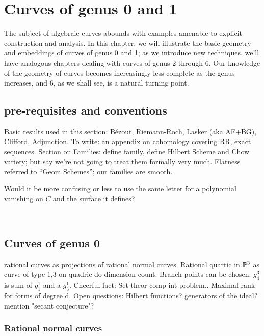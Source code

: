 

\chapter{Curves of genus 0 and 1}\label{genus 0 and 1 chapter}

The subject of algebraic curves abounds with examples amenable to explicit construction and analysis. In this chapter, we will illustrate  the basic geometry and embeddings of curves of genus 0 and 1; as we introduce new techniques, we'll have analogous chapters dealing with curves of genus 2 through 6. Our knowledge of the geometry of curves becomes increasingly less complete as the genus increases, and 6, as we shall see, is a natural turning point. 
\section{pre-requisites and conventions}


Basic results used in this section: B\'ezout, Riemann-Roch, Lasker (aka AF+BG), Clifford, Adjunction.
To write: an appendix on cohomology covering RR, exact sequences.
Section on Families: define family, define Hilbert Scheme and Chow variety;  but say we're not going to treat them formally very much. Flatness referred to ``Geom Schemes''; our families are smooth.



Would it be more confusing or less to use the same letter for a polynomial vanishing on $C$ and the surface it defines?

\




\section{Curves of genus 0} 

rational curves as projections of rational normal curves. Rational quartic in ${\mathbb P}^3$ as curve of type 1,3 on quadric do dimension count. Branch points can be chosen. $g^3_4$ is sum of $g^1_1$ and a $g^1_3$. Cheerful fact: Set theor comp int problem.. Maximal rank for forms of degree d. Open questions: Hilbert functions? generators of the ideal? mention "secant conjecture"?

\subsection{Rational normal curves}

